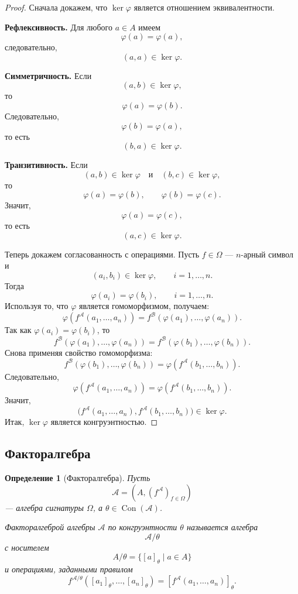 \documentclass[12pt,a4paper]{article}
\newtheorem{definition}{Определение}
\begin{document}
\begin{proof}
Сначала докажем, что $\ker\varphi$ является отношением эквивалентности.

\textbf{Рефлексивность.} Для любого $a\in A$ имеем
\[
\varphi(a)=\varphi(a),
\]
следовательно,
\[
(a,a)\in\ker\varphi.
\]

\textbf{Симметричность.} Если
\[
(a,b)\in\ker\varphi,
\]
то
\[
\varphi(a)=\varphi(b).
\]
Следовательно,
\[
\varphi(b)=\varphi(a),
\]
то есть
\[
(b,a)\in\ker\varphi.
\]

\textbf{Транзитивность.} Если
\[
(a,b)\in\ker\varphi
\quad\text{и}\quad
(b,c)\in\ker\varphi,
\]
то
\[
\varphi(a)=\varphi(b),
\qquad
\varphi(b)=\varphi(c).
\]
Значит,
\[
\varphi(a)=\varphi(c),
\]
то есть
\[
(a,c)\in\ker\varphi.
\]

Теперь докажем согласованность с операциями. Пусть $f\in\Omega$ --- $n$-арный символ и
\[
(a_i,b_i)\in\ker\varphi,
\qquad i=1,\dots,n.
\]
Тогда
\[
\varphi(a_i)=\varphi(b_i),
\qquad i=1,\dots,n.
\]
Используя то, что $\varphi$ является гомоморфизмом, получаем:
\[
\varphi(f^{\mathcal A}(a_1,\dots,a_n))
=
f^{\mathcal B}(\varphi(a_1),\dots,\varphi(a_n)).
\]
Так как $\varphi(a_i)=\varphi(b_i)$, то
\[
f^{\mathcal B}(\varphi(a_1),\dots,\varphi(a_n))
=
f^{\mathcal B}(\varphi(b_1),\dots,\varphi(b_n)).
\]
Снова применяя свойство гомоморфизма:
\[
f^{\mathcal B}(\varphi(b_1),\dots,\varphi(b_n))
=
\varphi(f^{\mathcal A}(b_1,\dots,b_n)).
\]
Следовательно,
\[
\varphi(f^{\mathcal A}(a_1,\dots,a_n))
=
\varphi(f^{\mathcal A}(b_1,\dots,b_n)).
\]
Значит,
\[
\bigl(f^{\mathcal A}(a_1,\dots,a_n),
f^{\mathcal A}(b_1,\dots,b_n)\bigr)\in\ker\varphi.
\]
Итак, $\ker\varphi$ является конгруэнтностью.
\end{proof}

\subsection{Факторалгебра}

\begin{definition}[Факторалгебра]
Пусть
\[
\mathcal A=(A,(f^{\mathcal A})_{f\in\Omega})
\]
--- алгебра сигнатуры $\Omega$, а $\theta\in\operatorname{Con}(\mathcal A)$.

\emph{Факторалгеброй} алгебры $\mathcal A$ по конгруэнтности $\theta$ называется алгебра
\[
\mathcal A/\theta
\]
с носителем
\[
A/\theta=\{[a]_\theta\mid a\in A\}
\]
и операциями, заданными правилом
\[
f^{\mathcal A/\theta}([a_1]_\theta,\dots,[a_n]_\theta)
=
[f^{\mathcal A}(a_1,\dots,a_n)]_\theta.
\]
\end{definition}
\end{document}
